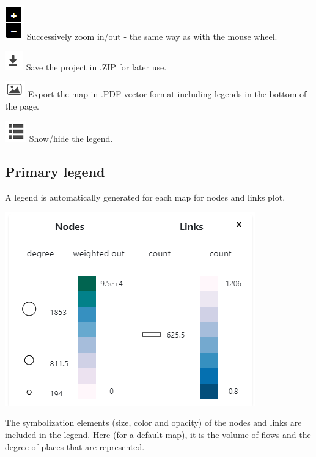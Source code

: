 \documentclass[
  letterpaper,
  DIV=11,
  numbers=noendperiod]{scrreprt}
\begin{document}
\includegraphics{images/Buton_in_out.png} Successively zoom in/out - the
same way as with the mouse wheel.

\includegraphics{images/Buton_sauv.png} Save the project in .ZIP for
later use.

\includegraphics{images/Buton_export.png} Export the map in .PDF vector
format including legends in the bottom of the page.

\includegraphics{images/Buton_leg.png} Show/hide the legend.

\subsection{Primary legend}\label{primary-legend}

A legend is automatically generated for each map for nodes and links
plot.

\includegraphics{images/center_legend.png}

The symbolization elements (size, color and opacity) of the nodes and
links are included in the legend. Here (for a default map), it is the
volume of flows and the degree of places that are represented.
\end{document}
